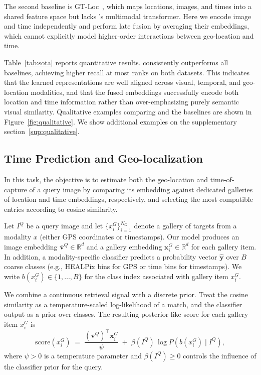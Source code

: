 The second baseline is GT-Loc~\cite{Shatwell_2025_ICCV}, which maps locations, images, and times into a shared feature space but lacks \tiger's multimodal transformer. Here we encode image and time independently and perform late fusion by averaging their embeddings, which cannot explicitly model higher-order interactions between geo-location and time.

Table~\ref{tab:sota} reports quantitative results. \tiger consistently outperforms all baselines, achieving higher recall at most ranks on both datasets. This indicates that the learned representations are well aligned across visual, temporal, and geo-location modalities, and that the fused embeddings successfully encode both location and time information rather than over-emphasizing purely semantic visual similarity. Qualitative examples comparing \tiger and the baselines are shown in Figure~\ref{fig:qualitative}. We show additional examples on the supplementary section~\ref{sup:qualitative}.


\subsection{Time Prediction and Geo-localization}

In this task, the objective is to estimate both the geo-location and time-of-capture of a query image by comparing its embedding against dedicated galleries of location and time embeddings, respectively, and selecting the most compatible entries according to cosine similarity.

Let $I^{Q}$ be a query image and let $\{x_i^{G}\}_{i=1}^{N_G}$ denote a gallery of targets from a modality $x$ (either GPS coordinates or timestamps). Our model produces an image embedding $\bar{\mathbf{v}}^{Q}\!\in\!\mathbb{R}^{d}$ and a gallery embedding $\mathbf{x}^{G}_i\!\in\!\mathbb{R}^{d}$ for each gallery item. In addition, a modality-specific classifier predicts a probability vector $\hat{\mathbf{y}}$ over $B$ coarse classes (e.g., HEALPix bins for GPS or time bins for timestamps). We write $b(x_i^{G})\!\in\!\{1,\dots,B\}$ for the class index associated with gallery item $x_i^{G}$.

We combine a continuous retrieval signal with a discrete prior. Treat the cosine similarity as a temperature-scaled log-likelihood of a match, and the classifier output as a prior over classes. The resulting posterior-like score for each gallery item $x_i^{G}$ is
\begin{equation}
    \label{eq:poe-score}
    \mathrm{score}(x_i^{G})
    \;=\;
    \frac{(\bar{\mathbf{v}}^{Q})^{\top}\mathbf{x}^{G}_i}{\psi}
    \;+\;
    \beta(I^{Q})\,\log P\!\left(b(x_i^{G}) \mid I^{Q}\right),
\end{equation}
where $\psi\!>\!0$ is a temperature parameter and $\beta(I^{Q})\!\ge\!0$ controls the influence of the classifier prior for the query.

